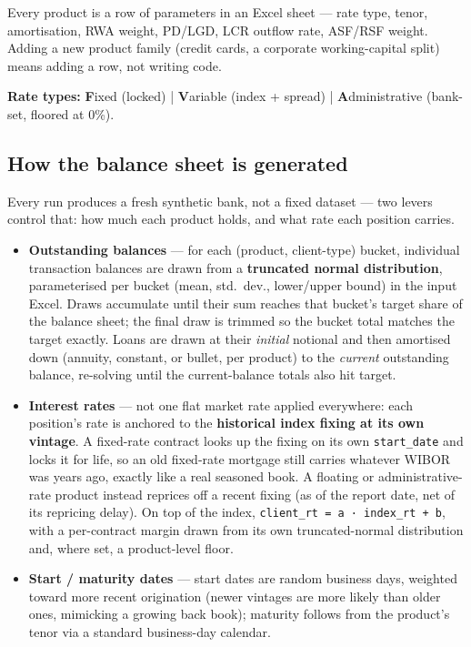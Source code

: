 \documentclass[11pt,a4paper]{article}
\begin{document}
Every product is a row of parameters in an Excel sheet --- rate type, tenor,
amortisation, RWA weight, PD/LGD, LCR outflow rate, ASF/RSF weight. Adding a
new product family (credit cards, a corporate working-capital split) means
adding a row, not writing code.

\textbf{Rate types:} \textbf{F}ixed (locked) \;|\; \textbf{V}ariable (index +
spread) \;|\; \textbf{A}dministrative (bank-set, floored at 0\%).

\subsection{How the balance sheet is generated}
Every run produces a fresh synthetic bank, not a fixed dataset --- two levers
control that: how much each product holds, and what rate each position carries.

\begin{itemize}[itemsep=2pt]
  \item \textbf{Outstanding balances} --- for each (product, client-type) bucket,
        individual transaction balances are drawn from a \textbf{truncated normal
        distribution}, parameterised per bucket (mean, std.\ dev., lower/upper
        bound) in the input Excel. Draws accumulate until their sum reaches that
        bucket's target share of the balance sheet; the final draw is trimmed so
        the bucket total matches the target exactly. Loans are drawn at their
        \textit{initial} notional and then amortised down (annuity, constant, or
        bullet, per product) to the \textit{current} outstanding balance, re-solving
        until the current-balance totals also hit target.
  \item \textbf{Interest rates} --- not one flat market rate applied everywhere:
        each position's rate is anchored to the \textbf{historical index fixing at
        its own vintage}. A fixed-rate contract looks up the fixing on its own
        \texttt{start\_date} and locks it for life, so an old fixed-rate mortgage
        still carries whatever WIBOR was years ago, exactly like a real seasoned
        book. A floating or administrative-rate product instead reprices off a
        recent fixing (as of the report date, net of its repricing delay). On top
        of the index, \texttt{client\_rt = a · index\_rt + b}, with a
        per-contract margin drawn from its own truncated-normal distribution and,
        where set, a product-level floor.
  \item \textbf{Start / maturity dates} --- start dates are random business days,
        weighted toward more recent origination (newer vintages are more likely
        than older ones, mimicking a growing back book); maturity follows from the
        product's tenor via a standard business-day calendar.
\end{itemize}
\end{document}
